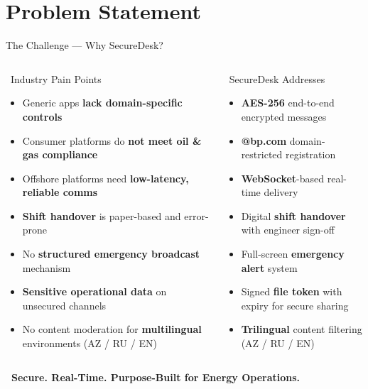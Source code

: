 \documentclass[aspectratio=169,12pt]{beamer}
\begin{document}
\section{Problem Statement}

\begin{frame}{The Challenge --- Why SecureDesk?}
\begin{columns}[t]
\begin{alertblock}{\faExclamationCircle\ Industry Pain Points}
\small
\begin{itemize}\setlength\itemsep{5pt}
  \item Generic apps \textbf{lack domain-specific controls}
  \item Consumer platforms do \textbf{not meet oil \& gas compliance}
  \item Offshore platforms need \textbf{low-latency, reliable comms}
  \item \textbf{Shift handover} is paper-based and error-prone
  \item No \textbf{structured emergency broadcast} mechanism
  \item \textbf{Sensitive operational data} on unsecured channels
  \item No content moderation for \textbf{multilingual} environments (AZ / RU / EN)
\end{itemize}
\end{alertblock}

\begin{exampleblock}{\faCheckCircle\ SecureDesk Addresses}
\small
\begin{itemize}\setlength\itemsep{5pt}
  \item \textbf{AES-256} end-to-end encrypted messages
  \item \textbf{@bp.com} domain-restricted registration
  \item \textbf{WebSocket}-based real-time delivery
  \item Digital \textbf{shift handover} with engineer sign-off
  \item Full-screen \textbf{emergency alert} system
  \item Signed \textbf{file token} with expiry for secure sharing
  \item \textbf{Trilingual} content filtering (AZ / RU / EN)
\end{itemize}
\end{exampleblock}
\end{columns}

\vspace{6pt}
\begin{tcolorbox}[colback=AccentGold!10,colframe=AccentGold,arc=4pt,boxrule=0.8pt,
  left=4pt,right=4pt,top=2pt,bottom=2pt]
\centering\small\bfseries
\faQuoteLeft\ Secure. Real-Time. Purpose-Built for Energy Operations. \faQuoteRight
\end{tcolorbox}
\end{frame}
\end{document}
